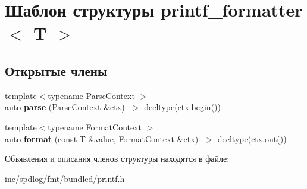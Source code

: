 \hypertarget{structprintf__formatter}{}\section{Шаблон структуры printf\+\_\+formatter$<$ T $>$}
\label{structprintf__formatter}
\subsection*{Открытые члены}
\begin{DoxyCompactItemize}
\item 
\mbox{\label{structprintf__formatter_ad4ca7b204b381a7fdb7c4a94952217b3}} 
{\footnotesize template$<$typename Parse\+Context $>$ }\\auto {\bfseries parse} (Parse\+Context \&ctx) -\/$>$ decltype(ctx.\+begin())
\item 
\mbox{\label{structprintf__formatter_a339e8b7c2916129b1e1001bfd68fe584}} 
{\footnotesize template$<$typename Format\+Context $>$ }\\auto {\bfseries format} (const T \&value, Format\+Context \&ctx) -\/$>$ decltype(ctx.\+out())
\end{DoxyCompactItemize}


Объявления и описания членов структуры находятся в файле\+:\begin{DoxyCompactItemize}
\item 
inc/spdlog/fmt/bundled/printf.\+h\end{DoxyCompactItemize}

